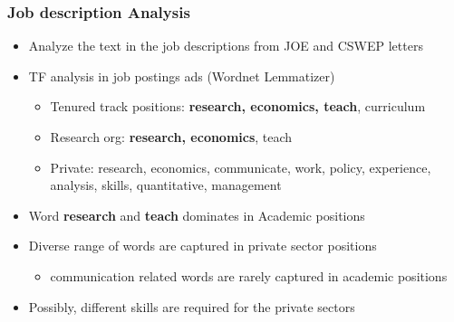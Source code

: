 \documentclass[10pt,svgnames,fragile]{beamer}
\begin{document}
{	
	\begin{frame}
		\frametitle{Job description Analysis}
		\begin{itemize}
			\item Analyze the text in the job descriptions from JOE and CSWEP letters
			\vfill
			\item TF analysis in job postings ads (Wordnet Lemmatizer)
			\begin{itemize}
				\vspace{1 mm}
				\item Tenured track positions: \textbf{research, economics, teach}, curriculum
				\vspace{1 mm}
				\item Research org: \textbf{research, economics}, teach
				\vspace{1 mm}
				\item Private: research, economics, communicate, work, policy, experience, analysis, skills, quantitative, management
			\end{itemize}
			\vfill		
			\item Word \textbf{research} and \textbf{teach} dominates in Academic positions
			\vfill
			\item Diverse range of words are captured in private sector positions
			\vspace{1 mm}
			\begin{itemize}
				\item communication related words are rarely captured in academic positions
			\end{itemize} 
			\vfill
			\item Possibly, different skills are required for the private sectors 
			\vfill
		\end{itemize}
	\end{frame}
	
	

}
\end{document}
